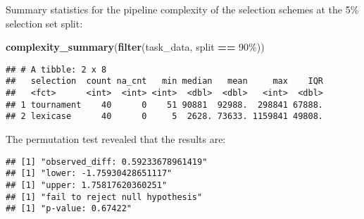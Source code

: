 \documentclass[
]{book}
\newenvironment{Shaded}{\begin{snugshade}}{\end{snugshade}}
\newcommand{\AttributeTok}[1]{\textcolor[rgb]{0.13,0.29,0.53}{#1}}
\newcommand{\DecValTok}[1]{\textcolor[rgb]{0.00,0.00,0.81}{#1}}
\newcommand{\FunctionTok}[1]{\textcolor[rgb]{0.13,0.29,0.53}{\textbf{#1}}}
\newcommand{\NormalTok}[1]{#1}
\newcommand{\OtherTok}[1]{\textcolor[rgb]{0.56,0.35,0.01}{#1}}
\newcommand{\SpecialCharTok}[1]{\textcolor[rgb]{0.81,0.36,0.00}{\textbf{#1}}}
\newcommand{\StringTok}[1]{\textcolor[rgb]{0.31,0.60,0.02}{#1}}
\begin{document}
Summary statistics for the pipeline complexity of the selection schemes at the 5\% selection set split:

\begin{Shaded}
\begin{Highlighting}[]
\FunctionTok{complexity\_summary}\NormalTok{(}\FunctionTok{filter}\NormalTok{(task\_data, split }\SpecialCharTok{==} \StringTok{\textquotesingle{}90\%\textquotesingle{}}\NormalTok{))}
\end{Highlighting}
\end{Shaded}

\begin{verbatim}
## # A tibble: 2 x 8
##   selection  count na_cnt   min median   mean     max    IQR
##   <fct>      <int>  <int> <int>  <dbl>  <dbl>   <int>  <dbl>
## 1 tournament    40      0    51 90881  92988.  298841 67888.
## 2 lexicase      40      0     5  2628. 73633. 1159841 49808.
\end{verbatim}

The permutation test revealed that the results are:

\begin{Shaded}
\end{Shaded}

\begin{verbatim}
## [1] "observed_diff: 0.59233678961419"
## [1] "lower: -1.75930428651117"
## [1] "upper: 1.75817620360251"
## [1] "fail to reject null hypothesis"
## [1] "p-value: 0.67422"
\end{verbatim}
\end{document}
